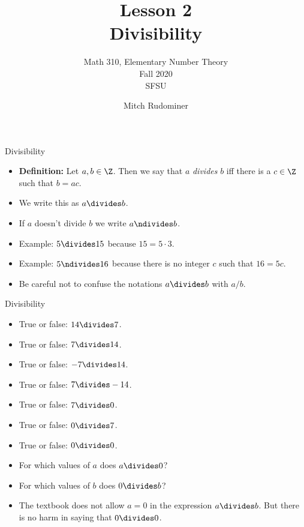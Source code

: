 \documentclass{beamer}
\title{Lesson 2 \\ Divisibility}
\subtitle{Math 310, Elementary Number Theory \\ Fall 2020 \\ SFSU}
\author{Mitch Rudominer}
\date{}
\begin{document}
\begin{frame}
  \titlepage
\end{frame}


\begin{frame}{Divisibility}


\begin{itemize}
  \item \textbf{Definition:} Let $a,b\in\Z$. Then we say that $a$ \emph{divides}
  $b$ iff there is a $c\in\Z$ such that $b = a c$.
  \item We write this as $a\divides b$.
  \item If $a$ doesn't divide $b$ we write $a\ndivides b$.
  \item Example: $5 \divides 15$ because $15 = 5 \cdot 3$.
  \item Example: $5 \ndivides 16$ because there is no integer $c$ such that
  $16 = 5  c$.
  \item Be careful not to confuse the notations $a\divides b$ with $a / b$.
\end{itemize}

\end{frame}

\begin{frame}{Divisibility}

\begin{itemize}
  \item True or false: $14 \divides 7$.
  \item True or false: $7 \divides 14$.
  \item True or false: $-7 \divides 14$.
  \item True or false: $7 \divides -14$.
  \item True or false: $7 \divides 0$.
  \item True or false: $0 \divides 7$.
  \item True or false: $0 \divides 0$.
  \item For which values of $a$ does $a \divides 0$?
  \item For which values of $b$ does $0 \divides b$?
  \item The textbook does not allow $a=0$ in the expression $a\divides b$.
  But there is no harm in saying that $0\divides 0$.
\end{itemize}

\end{frame}
\end{document}

